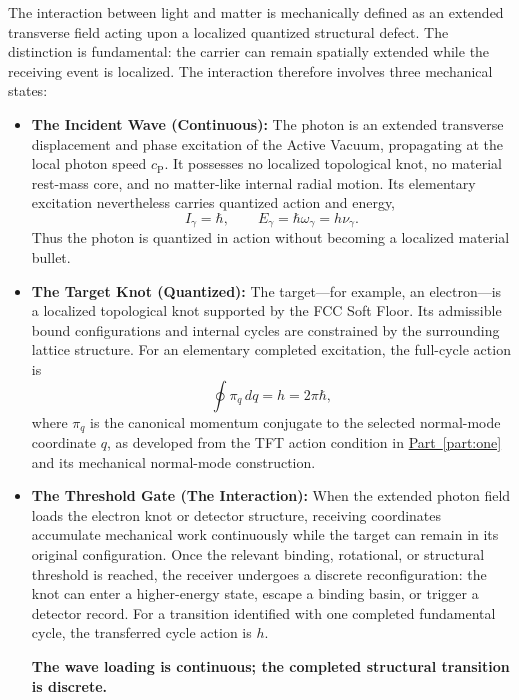 \noindent The interaction between light and matter is mechanically defined as an extended transverse field acting upon a localized quantized structural defect. The distinction is fundamental: the carrier can remain spatially extended while the receiving event is localized. The interaction therefore involves three mechanical states:
\begin{itemize}
    \item \textbf{The Incident Wave (Continuous):}
    The photon is an extended transverse displacement and phase excitation of the Active Vacuum, propagating at the local photon speed $c_{\mathrm P}$. It possesses no localized topological knot, no material rest-mass core, and no matter-like internal radial motion. Its elementary excitation nevertheless carries quantized action and energy,
    \begin{equation}
        I_\gamma=\hbar,
        \qquad
        E_\gamma=\hbar\omega_\gamma=h\nu_\gamma.
    \end{equation}
    Thus the photon is quantized in action without becoming a localized material bullet.

    \item \textbf{The Target Knot (Quantized):}
    The target---for example, an electron---is a localized topological knot supported by the FCC Soft Floor. Its admissible bound configurations and internal cycles are constrained by the surrounding lattice structure. For an elementary completed excitation, the full-cycle action is
\begin{equation}
    \oint \pi_q\,dq = h = 2\pi\hbar,
\end{equation}
where $\pi_q$ is the canonical momentum conjugate to the selected normal-mode coordinate $q$, as developed from the TFT action condition in
\hyperref[part:one]{Part~\ref*{part:one}} and its mechanical normal-mode construction.

    \item \textbf{The Threshold Gate (The Interaction):}
    When the extended photon field loads the electron knot or detector structure, receiving coordinates accumulate mechanical work continuously while the target can remain in its original configuration. Once the relevant binding, rotational, or structural threshold is reached, the receiver undergoes a discrete reconfiguration: the knot can enter a higher-energy state, escape a binding basin, or trigger a detector record. For a transition identified with one completed fundamental cycle, the transferred cycle action is $h$.

    \textbf{The wave loading is continuous; the completed structural transition is discrete.}
\end{itemize}

